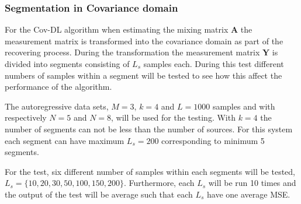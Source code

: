 \subsubsection{Segmentation in Covariance domain}
For the Cov-DL algorithm when estimating the mixing matrix $\mathbf{A}$ the measurement matrix is transformed into the covariance domain as part of the recovering process. During the transformation the measurement matrix $\mathbf{Y}$ is divided into segments consisting of $L_s$ samples each.
During this test different numbers of samples within a segment will be tested to see how this affect the performance of the algorithm.

The autoregressive data sets,  $M = 3$, $k = 4$ and $L = 1000$ samples and with respectively $N = 5$ and $N=8$, will be used for the testing. With $k = 4$ the number of segments can not be less than the number of sources. For this system each segment can have maximum $L_s = 200$ corresponding to minimum 5 segments. 

For the test, six different number of samples within each segments will be tested, $L_s = \{ 10, 20, 30, 50, 100, 150, 200 \}$. Furthermore, each $L_s$ will be run 10 times and the output of the test will be average such that each $L_s$ have one average MSE.

